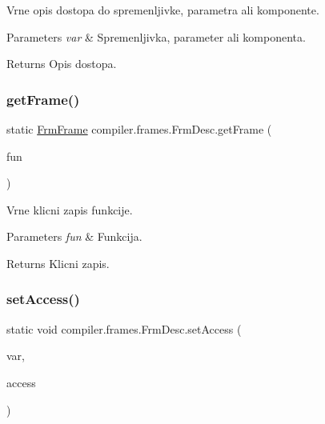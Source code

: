 Vrne opis dostopa do spremenljivke, parametra ali komponente.


\begin{DoxyParams}{Parameters}
{\em var} & Spremenljivka, parameter ali komponenta. \\
\hline
\end{DoxyParams}
\begin{DoxyReturn}{Returns}
Opis dostopa. 
\end{DoxyReturn}
\mbox{\label{classcompiler_1_1frames_1_1_frm_desc_a01656952662f7132eecf87da7fd7f2ec}} 
\subsubsection{\texorpdfstring{get\+Frame()}{getFrame()}}
{\footnotesize\ttfamily static \hyperlink{classcompiler_1_1frames_1_1_frm_frame}{Frm\+Frame} compiler.\+frames.\+Frm\+Desc.\+get\+Frame (\begin{DoxyParamCaption}\item[{\hyperlink{classcompiler_1_1abstr_1_1tree_1_1_abs_tree}{Abs\+Tree}}]{fun }\end{DoxyParamCaption})\hspace{0.3cm}{\ttfamily [static]}}

Vrne klicni zapis funkcije.


\begin{DoxyParams}{Parameters}
{\em fun} & Funkcija. \\
\hline
\end{DoxyParams}
\begin{DoxyReturn}{Returns}
Klicni zapis. 
\end{DoxyReturn}
\mbox{\label{classcompiler_1_1frames_1_1_frm_desc_a2c1d68dbff5ca39ab5ffaf4b098a2875}} 
\subsubsection{\texorpdfstring{set\+Access()}{setAccess()}}
{\footnotesize\ttfamily static void compiler.\+frames.\+Frm\+Desc.\+set\+Access (\begin{DoxyParamCaption}\item[{\hyperlink{classcompiler_1_1abstr_1_1tree_1_1def_1_1_abs_def}{Abs\+Def}}]{var,  }\item[{\hyperlink{interfacecompiler_1_1frames_1_1_frm_access}{Frm\+Access}}]{access }\end{DoxyParamCaption})\hspace{0.3cm}{\ttfamily [static]}}

